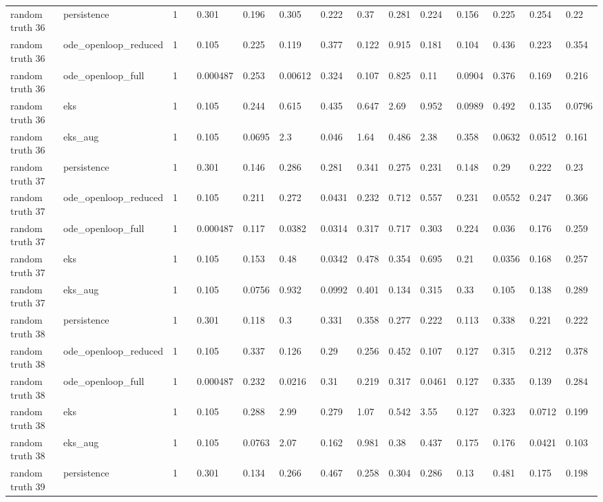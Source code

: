 \begin{table}[t]
\begin{tabular}{lllllllllllllll}
random truth 36 & persistence & 1 &  & 0.301 & 0.196 & 0.305 & 0.222 & 0.37 & 0.281 & 0.224 & 0.156 & 0.225 & 0.254 & 0.22 \\
random truth 36 & ode\_openloop\_reduced & 1 &  & 0.105 & 0.225 & 0.119 & 0.377 & 0.122 & 0.915 & 0.181 & 0.104 & 0.436 & 0.223 & 0.354 \\
random truth 36 & ode\_openloop\_full & 1 &  & 0.000487 & 0.253 & 0.00612 & 0.324 & 0.107 & 0.825 & 0.11 & 0.0904 & 0.376 & 0.169 & 0.216 \\
random truth 36 & eks & 1 &  & 0.105 & 0.244 & 0.615 & 0.435 & 0.647 & 2.69 & 0.952 & 0.0989 & 0.492 & 0.135 & 0.0796 \\
random truth 36 & eks\_aug & 1 &  & 0.105 & 0.0695 & 2.3 & 0.046 & 1.64 & 0.486 & 2.38 & 0.358 & 0.0632 & 0.0512 & 0.161 \\
random truth 37 & persistence & 1 &  & 0.301 & 0.146 & 0.286 & 0.281 & 0.341 & 0.275 & 0.231 & 0.148 & 0.29 & 0.222 & 0.23 \\
random truth 37 & ode\_openloop\_reduced & 1 &  & 0.105 & 0.211 & 0.272 & 0.0431 & 0.232 & 0.712 & 0.557 & 0.231 & 0.0552 & 0.247 & 0.366 \\
random truth 37 & ode\_openloop\_full & 1 &  & 0.000487 & 0.117 & 0.0382 & 0.0314 & 0.317 & 0.717 & 0.303 & 0.224 & 0.036 & 0.176 & 0.259 \\
random truth 37 & eks & 1 &  & 0.105 & 0.153 & 0.48 & 0.0342 & 0.478 & 0.354 & 0.695 & 0.21 & 0.0356 & 0.168 & 0.257 \\
random truth 37 & eks\_aug & 1 &  & 0.105 & 0.0756 & 0.932 & 0.0992 & 0.401 & 0.134 & 0.315 & 0.33 & 0.105 & 0.138 & 0.289 \\
random truth 38 & persistence & 1 &  & 0.301 & 0.118 & 0.3 & 0.331 & 0.358 & 0.277 & 0.222 & 0.113 & 0.338 & 0.221 & 0.222 \\
random truth 38 & ode\_openloop\_reduced & 1 &  & 0.105 & 0.337 & 0.126 & 0.29 & 0.256 & 0.452 & 0.107 & 0.127 & 0.315 & 0.212 & 0.378 \\
random truth 38 & ode\_openloop\_full & 1 &  & 0.000487 & 0.232 & 0.0216 & 0.31 & 0.219 & 0.317 & 0.0461 & 0.127 & 0.335 & 0.139 & 0.284 \\
random truth 38 & eks & 1 &  & 0.105 & 0.288 & 2.99 & 0.279 & 1.07 & 0.542 & 3.55 & 0.127 & 0.323 & 0.0712 & 0.199 \\
random truth 38 & eks\_aug & 1 &  & 0.105 & 0.0763 & 2.07 & 0.162 & 0.981 & 0.38 & 0.437 & 0.175 & 0.176 & 0.0421 & 0.103 \\
random truth 39 & persistence & 1 &  & 0.301 & 0.134 & 0.266 & 0.467 & 0.258 & 0.304 & 0.286 & 0.13 & 0.481 & 0.175 & 0.198 \\

\end{tabular}
\end{table}
